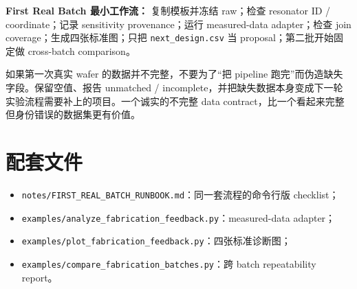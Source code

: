 \begin{measurebox}
\textbf{First Real Batch 最小工作流：}
复制模板并冻结 raw；检查 resonator ID / coordinate；记录 sensitivity provenance；运行 measured-data adapter；检查 join coverage；生成四张标准图；只把 \texttt{next\_design.csv} 当 proposal；第二批开始固定做 cross-batch comparison。
\end{measurebox}

\begin{checkpointbox}
如果第一次真实 wafer 的数据并不完整，不要为了“把 pipeline 跑完”而伪造缺失字段。保留空值、报告 unmatched / incomplete，并把缺失数据本身变成下一轮实验流程需要补上的项目。一个诚实的不完整 data contract，比一个看起来完整但身份错误的数据集更有价值。
\end{checkpointbox}

\section*{配套文件}

\begin{itemize}
  \item \texttt{notes/FIRST\_REAL\_BATCH\_RUNBOOK.md}：同一套流程的命令行版 checklist；
  \item \texttt{examples/analyze\_fabrication\_feedback.py}：measured-data adapter；
  \item \texttt{examples/plot\_fabrication\_feedback.py}：四张标准诊断图；
  \item \texttt{examples/compare\_fabrication\_batches.py}：跨 batch repeatability report。
\end{itemize}
